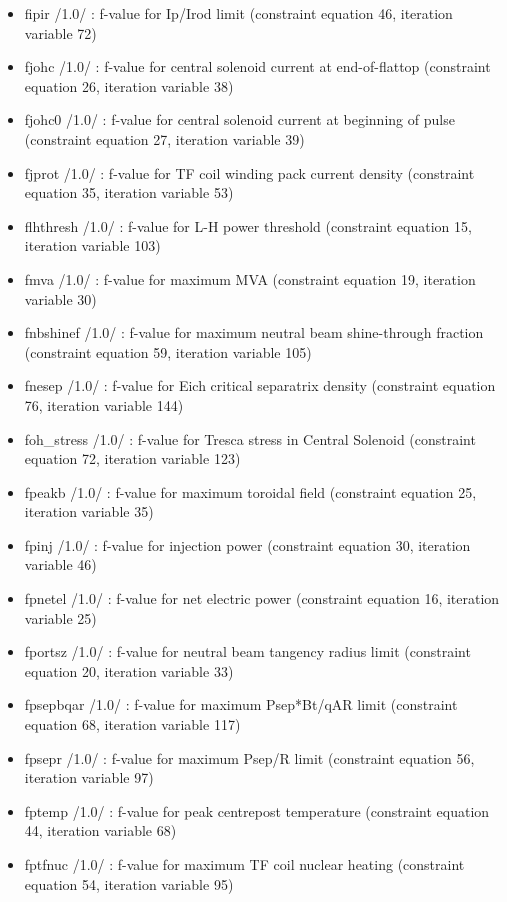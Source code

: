 \documentclass[]{article}
\begin{document}
\begin{itemize}
\item
  fipir /1.0/ : f-value for Ip/Irod limit (constraint equation 46,
  iteration variable 72)
\item
  fjohc /1.0/ : f-value for central solenoid current at end-of-flattop
  (constraint equation 26, iteration variable 38)
\item
  fjohc0 /1.0/ : f-value for central solenoid current at beginning of
  pulse (constraint equation 27, iteration variable 39)
\item
  fjprot /1.0/ : f-value for TF coil winding pack current density
  (constraint equation 35, iteration variable 53)
\item
  flhthresh /1.0/ : f-value for L-H power threshold (constraint equation
  15, iteration variable 103)
\item
  fmva /1.0/ : f-value for maximum MVA (constraint equation 19,
  iteration variable 30)
\item
  fnbshinef /1.0/ : f-value for maximum neutral beam shine-through
  fraction (constraint equation 59, iteration variable 105)
\item
  fnesep /1.0/ : f-value for Eich critical separatrix density
  (constraint equation 76, iteration variable 144)
\item
  foh\_stress /1.0/ : f-value for Tresca stress in Central Solenoid
  (constraint equation 72, iteration variable 123)
\item
  fpeakb /1.0/ : f-value for maximum toroidal field (constraint equation
  25, iteration variable 35)
\item
  fpinj /1.0/ : f-value for injection power (constraint equation 30,
  iteration variable 46)
\item
  fpnetel /1.0/ : f-value for net electric power (constraint equation
  16, iteration variable 25)
\item
  fportsz /1.0/ : f-value for neutral beam tangency radius limit
  (constraint equation 20, iteration variable 33)
\item
  fpsepbqar /1.0/ : f-value for maximum Psep*Bt/qAR limit (constraint
  equation 68, iteration variable 117)
\item
  fpsepr /1.0/ : f-value for maximum Psep/R limit (constraint equation
  56, iteration variable 97)
\item
  fptemp /1.0/ : f-value for peak centrepost temperature (constraint
  equation 44, iteration variable 68)
\item
  fptfnuc /1.0/ : f-value for maximum TF coil nuclear heating
  (constraint equation 54, iteration variable 95)

\end{itemize}
\end{document}
